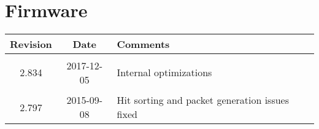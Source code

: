 \section{Firmware}
\begin{tabularx}{\textwidth}{|c|c|X|}
    \hline
    Revision & Date & Comments\\
    \hline\hline
    \hypertarget{fwrev}{2.834} & 2017-12-05 & Internal optimizations\\
    \hline
    {2.797} & 2015-09-08 & Hit sorting and packet generation issues fixed\\
    \hline
\end{tabularx}